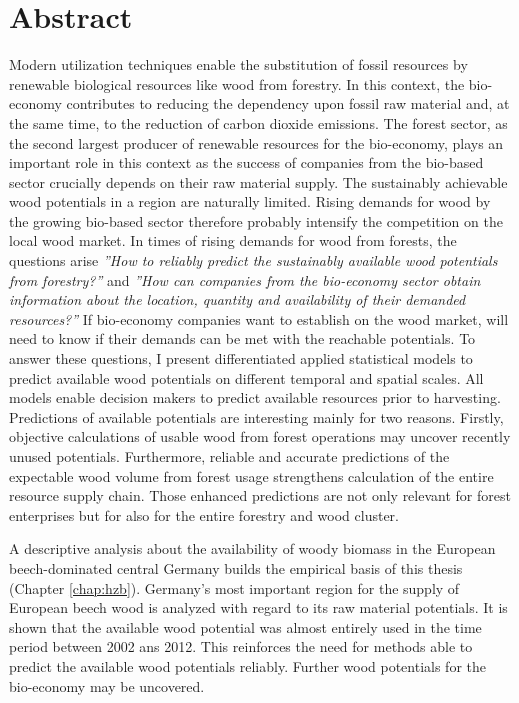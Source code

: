 \chapter*{Abstract}
\label{chap:Summary}
Modern utilization techniques enable the substitution of fossil resources by renewable biological resources like wood from forestry. In this context, the bio-economy contributes to reducing the dependency upon fossil raw material and, at the same time, to the reduction of carbon dioxide emissions. The forest sector, as the second largest producer of renewable resources for the bio-economy, plays an important role in this context as the success of companies from the bio-based sector crucially depends on their raw material supply. The sustainably achievable wood potentials in a region are naturally limited. Rising demands for wood by the growing bio-based sector therefore probably intensify the competition on the local wood market. In times of rising demands for wood from forests, the questions arise \textit{''How to reliably predict the sustainably available wood potentials from forestry?''} and \textit{''How can companies from the bio-economy sector obtain information about the location, quantity and availability of their demanded resources?''} If bio-economy companies want to establish on the wood market, will need to know if their demands can be met with the reachable potentials. To answer these questions, I present differentiated applied statistical models to predict available wood potentials on different temporal and spatial scales. All models enable decision makers to predict available resources prior to harvesting. Predictions of available potentials are interesting mainly for two reasons. Firstly, objective calculations of usable wood from forest operations may uncover recently unused potentials. Furthermore, reliable and accurate predictions of the expectable wood volume from forest usage strengthens calculation of the entire resource supply chain. Those enhanced predictions are not only relevant for forest enterprises but for also for the entire forestry and wood cluster.

A descriptive analysis about the availability of woody biomass in the European beech-dominated central Germany builds the empirical basis of this thesis (Chapter \ref{chap:hzb}). Germany's most important region for the supply of European beech wood is analyzed with regard to its raw material potentials. It is shown that the available wood potential was almost entirely used in the time period between 2002 ans 2012. This reinforces the need for methods able to predict the available wood potentials reliably. Further wood potentials for the bio-economy may be uncovered.

